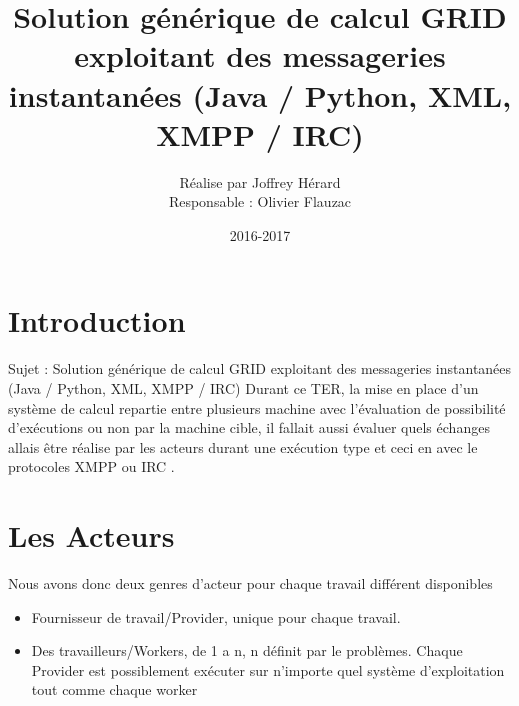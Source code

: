 \documentclass[11pt]{report}
\begin{document}
 \makeatletter
\def\maketitle{%
  \null
  \thispagestyle{empty}%
  \vfill
  \begin{center}\leavevmode
    \normalfont
    {\Huge \@title\par}%
    \vskip 3cm
    {\Large \@author\par}%
    \vskip 1cm
    {\Large \@date\par}%
  \end{center}%
  \vfill
  \null
  \cleardoublepage
  }
\makeatother
\title{Solution générique de calcul GRID exploitant des messageries instantanées
(Java / Python, XML, XMPP / IRC)}
\author{ Réalise par Joffrey Hérard \begin{center}Responsable : Olivier Flauzac\end{center}}
\date{2016-2017}
\maketitle
 
\tableofcontents 

\newpage
\chapter{Introduction} 
Sujet : Solution générique de calcul GRID exploitant des messageries instantanées
(Java / Python, XML, XMPP / IRC)
Durant ce TER, la mise en place d'un système de calcul repartie entre plusieurs machine avec l'évaluation de possibilité d'exécutions ou non par la machine cible, il fallait aussi évaluer quels échanges allais être réalise par les acteurs durant une exécution type et ceci en avec le protocoles XMPP ou IRC . 
\newpage
\chapter{Les Acteurs} 
Nous avons donc deux genres d'acteur pour chaque travail différent disponibles 
\begin{itemize}
\item Fournisseur de travail/Provider, unique pour chaque travail.
\item Des travailleurs/Workers, de 1 a n, n définit par le problèmes.
Chaque Provider est possiblement exécuter sur n'importe quel système d'exploitation  tout comme chaque worker
\end{itemize}
\newpage
\end{document}
